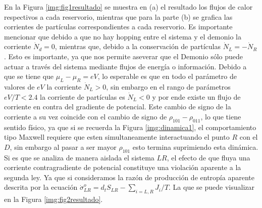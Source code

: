 En la Figura \ref{img:fig1resultado} se muestra en (a) el resultado los flujos de calor respectivos a cada reservorio, mientras que para la parte (b) se grafica las corrientes de partículas correspondientes a cada reservorio. Es importante mencionar que debido a que no hay hopping entre el sistema y el demonio la corriente $\dot{N}_{d}=0$, mientras que, debido a la conservación de partículas $\dot{N}_{L}=-\dot{N}_{R}$. Esto es importante, ya que nos permite aseverar que el Demonio sólo puede actuar a través del sistema mediante flujos de energía o información. Debido a que se tiene que $\mu_{L}-\mu_{R} = eV$, lo esperable es que en todo el parámetro de valores de $eV$ la corriente $\dot{N}_{L}>0$, sin embargo en el rango de parámetros $eV/T<2.4$ la corriente de partículas es $\dot{N}_{L}<0$ y por ende existe un flujo de corriente en contra del gradiente de potencial. Este cambio de signo de la corriente a su vez coincide con el cambio de signo de $\rho_{101}-\rho_{011}$, lo que tiene sentido físico, ya que si se recuerda la Figura \ref{img:dinamica1}, el comportamiento tipo Maxwell requiere que esten simultaneamente interactuando el punto $R$ con el $D$, sin embargo al pasar a ser mayor $\rho_{101}$ esto termina suprimiendo esta dinámica. \\
Si es que se analiza de manera aislada el sistema $LR$, el efecto de que fluya una corriente contragradiente de potencial constituye una violación aparente a la segunda ley. Ya que si consideramos la razón de producción de entropía aparente descrita por la ecuación $\dot{\sigma}^{o}_{LR}= d_{t}S_{LR} - \sum_{i=L,R}J_{i}/T$. La que se puede visualizar en la Figura \ref{img:fig2resultado}.



